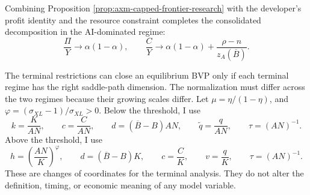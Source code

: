 Combining Proposition \ref{prop:axm-capped-frontier-research} with the
developer's profit identity and the resource constraint completes the
consolidated decomposition in the AI-dominated regime:
\begin{equation}
 \frac{\Pi}{Y}\to\alpha(1-\alpha),\qquad
 \frac{C}{Y}\to
 \alpha(1-\alpha)+\frac{\rho-n}{z_A(\overline B)}.
 \label{eq:axm-capped-ai-consolidated-shares}
\end{equation}

The terminal restrictions can close an equilibrium BVP only if each terminal
regime has the right saddle-path dimension. The normalization must differ
across the two regimes because their growing scales differ. Let
\(\mu=\eta/(1-\eta)\), and
\(\varphi=(\sigma_{XL}-1)/\sigma_{XL}>0\). Below the threshold, I use
\begin{equation}
 k=\frac{K}{AN},\qquad c=\frac{C}{AN},\qquad
 d=(\overline B-B)AN,\qquad
 \widetilde q=\frac{q}{AN},\qquad
 \tau=(AN)^{-1}.
 \label{eq:axm-capped-labor-normalization}
\end{equation}
Above the threshold, I use
\begin{equation}
 h=\left(\frac{AN}{K}\right)^\varphi,\qquad
 d=(\overline B-B)K,\qquad c=\frac{C}{K},\qquad
 v=\frac{q}{K},\qquad \tau=(AN)^{-1}.
 \label{eq:axm-capped-ai-normalization}
\end{equation}
These are changes of coordinates for the terminal analysis. They do not alter
the definition, timing, or economic meaning of any model variable.

